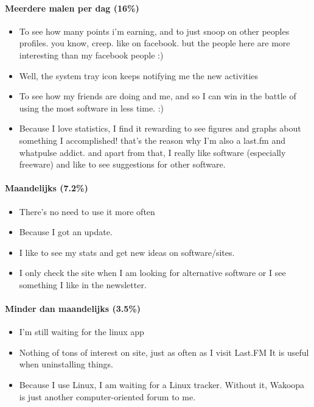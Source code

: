       \paragraph{Meerdere malen per dag (16\%)}
        \begin{itemize}
          \item To see how many points i'm earning, and to just snoop on other peoples profiles. you know, creep. like on facebook. but the people here are more interesting than my facebook people :)
          \item Well, the system tray icon keeps notifying me the new activities
          \item To see how my friends are doing and me, and so I can win in the battle of using the most software in less time. :)
          \item Because I love statistics, I find it rewarding to see figures and graphs about something I accomplished! that's the reason why I'm also a last.fm and whatpulse addict. and apart from that, I really like software (especially freeware) and like to see suggestions for other software.
        \end{itemize}

      \paragraph{Maandelijks (7.2\%)}
        \begin{itemize}
          \item There's no need to use it more often
          \item Because I got an update.
          \item I like to see my stats and get new ideas on software/sites.
          \item I only check the site when I am looking for alternative software or I see something I like in the newsletter.
        \end{itemize}

      \paragraph{Minder dan maandelijks (3.5\%)}
        \begin{itemize}
          \item I'm still waiting for the linux app
          \item Nothing of tons of interest on site, just as often as I visit Last.FM It is useful when uninstalling things.
          \item Because I use Linux, I am waiting for a Linux tracker. Without it, Wakoopa is just another computer-oriented forum to me.
        \end{itemize}

